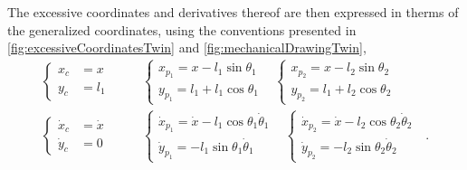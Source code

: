 %
The excessive coordinates and derivatives thereof are then expressed in therms of the generalized coordinates, using the conventions presented in \autoref{fig:excessiveCoordinatesTwin} and \ref{fig:mechanicalDrawingTwin},
\begin{align}
  \begin{cases}
    x_c &=  x  \\
    y_c &=  l_1  
  \end{cases} &
  \hspace{20pt}
  \begin{cases}
    x_{p_1} =  x   - l_1 \sin \theta_1 \\
    y_{p_1} =  l_1 + l_1 \cos \theta_1
  \end{cases}
  \hspace{10pt}
  \begin{cases}
    x_{p_2} =  x   - l_2 \sin \theta_2 \\
    y_{p_2} =  l_1 + l_2 \cos \theta_2
  \end{cases}
  \label{eq:excessiveToGeneralized} \\
  \begin{cases}
    \dot{x}_c &=  \dot{x}  \\
    \dot{y}_c &=  0  
  \end{cases} &
  \hspace{20pt}
  \begin{cases}
    \dot{x}_{p_1} =  \dot{x} - l_1 \cos \theta_1 \dot{\theta}_1 \\
    \dot{y}_{p_1} =  -l_1 \sin \theta_1 \dot{\theta}_1
  \end{cases}
  \hspace{10pt}
  \begin{cases}
    \dot{x}_{p_2} = \dot{x} - l_2 \cos \theta_2 \dot{\theta}_2 \\
    \dot{y}_{p_2} = -l_2 \sin \theta_2 \dot{\theta}_2
  \end{cases}  \ \ \ .
  \label{eq:excessiveToGeneralizedDerivatives}
\end{align}

